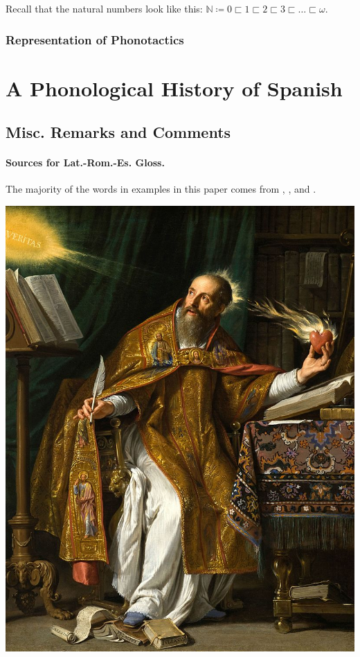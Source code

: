 \documentclass{report}[12pt]
\begin{document}
Recall that the natural numbers look like this: $\mathbb{N} \coloneq 0 \sqsubset 1 \sqsubset 2 \sqsubset 3 \sqsubset \dots \sqsubset \omega$.

\section{Representation of Phonotactics}

\part*{A Phonological History of Spanish}

\chapter*{Misc. Remarks and Comments}

\subsection*{Sources for Lat.-Rom.-Es. Gloss.}

The majority of the words in examples in this paper comes from \cite{romance_his}, \cite{lloyd_spanish}, and \cite{penny_spanish}. 

\pagebreak

\includegraphics[scale=0.5]{augustine.jpg}
\end{document}

